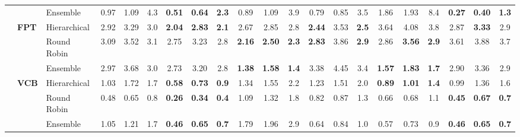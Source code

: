 \documentclass{ieeeaccess}
\begin{document}
{\begin{longtable}{@{\extracolsep{\fill}}lllccc|ccc|ccc|ccc|ccc|ccc}
 &  & Ensemble & 0.97 & 1.09 & 4.3 & \textbf{0.51} & \textbf{0.64} & \cellcolor{colorens}\textbf{2.3} & 0.89 & 1.09 & 3.9 & \cellcolor{colorens}0.79 & \cellcolor{colorens}0.85 & \cellcolor{colorens}3.5 & 1.86 & 1.93 & 8.4 & \cellcolor{colorens}\textbf{0.27} & \cellcolor{colorens}\textbf{0.40} & \cellcolor{colorens}\textbf{1.3} \\
\cmidrule(lr){2-21}
 & \multirow{3}{*}{\textbf{FPT}} & Hierarchical & \cellcolor{colorhier}2.92 & \cellcolor{colorhier}3.29 & \cellcolor{colorhier}3.0 & \cellcolor{colorhier}\textbf{2.04} & \cellcolor{colorhier}\textbf{2.83} & \cellcolor{colorhier}\textbf{2.1} & 2.67 & 2.85 & 2.8 & \cellcolor{colorhier}\textbf{2.44} & \cellcolor{colorhier}3.53 & \cellcolor{colorhier}\textbf{2.5} & 3.64 & 4.08 & 3.8 & \cellcolor{colorhier}2.87 & \cellcolor{colorhier}\textbf{3.33} & \cellcolor{colorhier}2.9 \\
 &  & Round Robin & 3.09 & 3.52 & 3.1 & 2.75 & 3.23 & 2.8 & \textbf{2.16} & \textbf{2.50} & \textbf{2.3} & \textbf{2.83} & 3.86 & \textbf{2.9} & 2.86 & \textbf{3.56} & \textbf{2.9} & 3.61 & 3.88 & 3.7 \\
 &  & Ensemble & 2.97 & 3.68 & \cellcolor{colorens}3.0 & 2.73 & 3.20 & 2.8 & \cellcolor{colorens}\textbf{1.38} & \cellcolor{colorens}\textbf{1.58} & \cellcolor{colorens}\textbf{1.4} & 3.38 & 4.45 & 3.4 & \cellcolor{colorens}\textbf{1.57} & \cellcolor{colorens}\textbf{1.83} & \cellcolor{colorens}\textbf{1.7} & 2.90 & 3.36 & \cellcolor{colorens}2.9 \\
\cmidrule(lr){2-21}
 & \multirow{3}{*}{\textbf{VCB}} & Hierarchical & 1.03 & 1.72 & 1.7 & \textbf{0.58} & \textbf{0.73} & \textbf{0.9} & 1.34 & 1.55 & 2.2 & 1.23 & 1.51 & 2.0 & \textbf{0.89} & \textbf{1.01} & \textbf{1.4} & 0.99 & 1.36 & 1.6 \\
 &  & Round Robin & \cellcolor{colorrr}0.48 & \cellcolor{colorrr}0.65 & \cellcolor{colorrr}0.8 & \cellcolor{colorrr}\textbf{0.26} & \cellcolor{colorrr}\textbf{0.34} & \cellcolor{colorrr}\textbf{0.4} & \cellcolor{colorrr}1.09 & \cellcolor{colorrr}1.32 & \cellcolor{colorrr}1.8 & 0.82 & 0.87 & 1.3 & 0.66 & \cellcolor{colorrr}0.68 & 1.1 & \cellcolor{colorrr}\textbf{0.45} & \textbf{0.67} & \cellcolor{colorrr}\textbf{0.7} \\
 &  & Ensemble & 1.05 & 1.21 & 1.7 & \textbf{0.46} & \textbf{0.65} & \textbf{0.7} & 1.79 & 1.96 & 2.9 & \cellcolor{colorens}0.64 & \cellcolor{colorens}0.84 & \cellcolor{colorens}1.0 & \cellcolor{colorens}0.57 & 0.73 & \cellcolor{colorens}0.9 & \textbf{0.46} & \cellcolor{colorens}\textbf{0.65} & \cellcolor{colorens}\textbf{0.7} \\

\end{longtable}}
\end{document}
